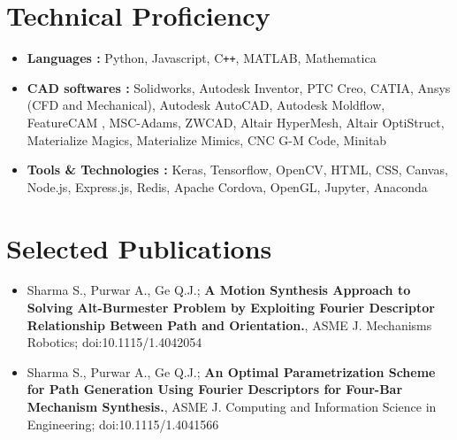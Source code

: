 \documentclass[letterpaper,10pt]{article}
\newcommand{\resumeSection}[1]{
\vspace{-12pt}
\section{\textbf{#1}}
}
\newcommand{\resumeItemListStart}{
\vspace{-7pt}
\begin{itemize}[leftmargin=14pt]
}
\newcommand{\resumeItemListEnd}{
\vspace{+7pt}
\end{itemize}
}
\newcommand{\resumeItem}[1]{
  \item\small{
      {#1 \vspace{-7pt}
      }
  }
}
\begin{document}
\resumeSection{Technical Proficiency}
	\vspace{+7pt}
	\resumeItemListStart
	\resumeItem{\textbf{Languages :} Python, Javascript, C\texttt{++}, MATLAB, Mathematica}
	\resumeItem{\textbf{CAD softwares :} Solidworks, Autodesk Inventor, PTC Creo, CATIA, Ansys (CFD and Mechanical), Autodesk AutoCAD, Autodesk Moldflow, FeatureCAM , MSC-Adams, ZWCAD, Altair HyperMesh, Altair OptiStruct, Materialize Magics, Materialize Mimics, CNC G-M Code, Minitab}
	\resumeItem{\textbf{Tools \& Technologies :} Keras, Tensorflow, OpenCV, HTML, CSS, Canvas, Node.js, Express.js, Redis, Apache Cordova, OpenGL, Jupyter, Anaconda}
	\resumeItemListEnd


\resumeSection{Selected Publications}
	\vspace{+7pt}
	\resumeItemListStart
	\resumeItem{Sharma S., Purwar A., Ge Q.J.; \textbf{A Motion Synthesis Approach to Solving Alt-Burmester Problem by Exploiting Fourier Descriptor Relationship Between Path and Orientation.}, ASME J. Mechanisms Robotics; doi:10.1115/1.4042054}
	\resumeItem{Sharma S., Purwar A., Ge Q.J.; \textbf{An Optimal Parametrization Scheme for Path Generation Using Fourier Descriptors for Four-Bar Mechanism Synthesis.}, ASME J. Computing and Information Science in Engineering; doi:10.1115/1.4041566}
	\resumeItemListEnd
\end{document}
